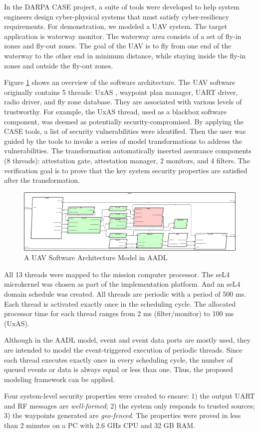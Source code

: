 

In the DARPA CASE project, a suite of tools were developed to help system engineers design cyber-physical systems that must satisfy cyber-resiliency requirements.
For demonstration, we modeled a UAV system. The target application is waterway monitor. The waterway area consists of a set of fly-in zones and fly-out zones. The goal of the UAV is to fly from one end of the waterway to the other end in minimum distance, while staying inside the fly-in zones and outside the fly-out zones.
 
Figure \ref{SW} shows an overview of the software architecture. The UAV software originally contains 5 threads: UxAS \cite{uxas}, waypoint plan manager, UART driver, radio driver, and fly zone database. They are associated with various levels of trustworthy. For example, the UxAS thread, used as a blackbox software component, was deemed as potentially security-compromised.
By applying the CASE tools, a list of security vulnerabilities were identified. Then the user was guided by the tools to invoke a series of model transformations to address the vulnerabilities. The transformation automatically inserted assurance components (8 threads): attestation gate, attestation manager, 2 monitors, and 4 filters. The verification goal is to prove that the key system security properties are satisfied after the transformation.

\begin{figure}[ht!]
\centering
\includegraphics[width=120mm]{sw3.png}
\caption{A UAV Software Architecture Model in AADL \label{SW}}
\end{figure}

All 13 threads were mapped to the mission computer processor. The seL4 microkernel was chosen as part of the implementation platform. And an seL4 domain schedule was created. All threads are periodic with a period of 500 ms. Each thread is activated exactly once in the scheduling cycle. The allocated processor time for each thread ranges from 2 ms (filter/monitor) to 100 ms (UxAS).

Although in the AADL model, event and event data ports are mostly used, they are intended to model the event-triggered execution of periodic threads. 
Since each thread executes exactly once in every scheduling cycle, the number of queued events or data is always equal or less than one. 
Thus, the proposed modeling framework can be applied.

Four system-level security properties were created to ensure: 1) the output UART and RF messages are \emph{well-formed}; 2) the system only responds to trusted sources; 3) the waypoints generated are \emph{geo-fenced}. The properties were proved in less than 2 minutes on a PC with 2.6 GHz CPU and 32 GB RAM.

